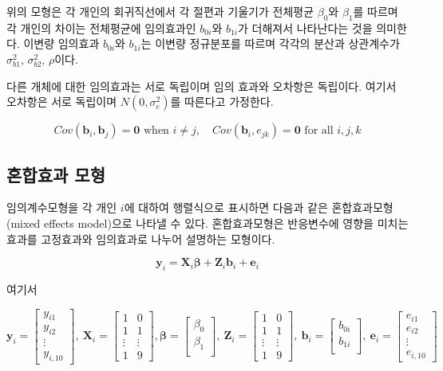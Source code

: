 \documentclass[
]{book}
\newcommand{\bm}[1]{ \symbf{#1}}
\begin{document}
위의 모형은 각 개인의 회귀직선에서 각 절편과 기울기가 전체평균 \(\beta_0\)와 \(\beta_1\)를 따르며 각 개인의 차이는 전체평균에 임의효과인 \(b_{0i}\)와 \(b_{1i}\)가 더해져서 나타난다는 것을 의미한다. 이변량 임의효과 \(b_{0i}\)와 \(b_{1i}\)는 이변량 정규분포를 따르며 각각의 분산과 상관계수가 \(\sigma^2_{b1}\), \(\sigma^2_{b2}\), \(\rho\)이다.

다른 개체에 대한 임의효과는 서로 독립이며 임의 효과와 오차항은 독립이다. 여기서 오차항은 서로 독립이며 \(N(0, \sigma^2_e)\)를 따른다고 가정한다.

\[  Cov(\bm b_{i}, \bm b_{j}) =\bm 0 \text{ when } i \ne j,\quad
Cov(\bm b_{i}, e_{jk}) =\bm 0 \text{ for all } i,j,k \]

\hypertarget{uxd63cuxd569uxd6a8uxacfc-uxbaa8uxd615}{%
\subsection{혼합효과 모형}\label{uxd63cuxd569uxd6a8uxacfc-uxbaa8uxd615}}

임의계수모형을 각 개인 \(i\)에 대하여 행렬식으로 표시하면 다음과 같은 혼합효과모형(mixed effects model)으로 나타낼 수 있다. 혼합효과모형은 반응변수에 영향을 미치는 효과를 고정효과와 임의효과로 나누어 설명하는 모형이다.

\[  
\bm y_i = \bm X_i \bm \beta + \bm Z_i \bm b_i + \bm e_i 
\]

여기서

\[  
\bm y_i=\begin{bmatrix}
y_{i1} \\
y_{i2} \\
\vdots \\
y_{i,10}
\end{bmatrix},~\bm X_i =
\begin{bmatrix}
1 & 0 \\
1 & 1 \\
\vdots & \vdots  \\
1 & 9 
\end{bmatrix}, \bm  \beta=
\begin{bmatrix}
\beta_{0} \\
\beta_{1} \\
\end{bmatrix}, ~\bm Z_i =
\begin{bmatrix}
1 & 0 \\
1 & 1 \\
\vdots & \vdots  \\
1 & 9 
\end{bmatrix},~ \bm b_i =
\begin{bmatrix}
b_{0i} \\
b_{1i} \\
\end{bmatrix},~
\bm  e_i= 
\begin{bmatrix}
e_{i1} \\
e_{i2} \\
\vdots \\
e_{i,10}
\end{bmatrix}
\]
\end{document}
